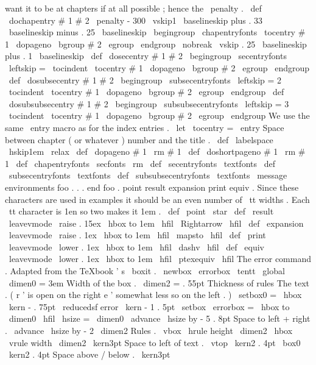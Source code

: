 {{want
it
to
be
at
chapters
%
if
at
all
possible
;
hence
the
\
penalty
.
\
def
\
dochapentry
#
1
#
2
{
%
\
penalty
-
300
\
vskip1
\
baselineskip
plus
.
33
\
baselineskip
minus
.
25
\
baselineskip
\
begingroup
\
chapentryfonts
\
tocentry
{
#
1
}
{
\
dopageno
\
bgroup
#
2
\
egroup
}
%
\
endgroup
\
nobreak
\
vskip
.
25
\
baselineskip
plus
.
1
\
baselineskip
}
\
def
\
dosecentry
#
1
#
2
{
\
begingroup
\
secentryfonts
\
leftskip
=
\
tocindent
\
tocentry
{
#
1
}
{
\
dopageno
\
bgroup
#
2
\
egroup
}
%
\
endgroup
}
\
def
\
dosubsecentry
#
1
#
2
{
\
begingroup
\
subsecentryfonts
\
leftskip
=
2
\
tocindent
\
tocentry
{
#
1
}
{
\
dopageno
\
bgroup
#
2
\
egroup
}
%
\
endgroup
}
\
def
\
dosubsubsecentry
#
1
#
2
{
\
begingroup
\
subsubsecentryfonts
\
leftskip
=
3
\
tocindent
\
tocentry
{
#
1
}
{
\
dopageno
\
bgroup
#
2
\
egroup
}
%
\
endgroup
}
%
We
use
the
same
\
entry
macro
as
for
the
index
entries
.
\
let
\
tocentry
=
\
entry
%
Space
between
chapter
(
or
whatever
)
number
and
the
title
.
\
def
\
labelspace
{
\
hskip1em
\
relax
}
\
def
\
dopageno
#
1
{
{
\
rm
#
1
}
}
\
def
\
doshortpageno
#
1
{
{
\
rm
#
1
}
}
\
def
\
chapentryfonts
{
\
secfonts
\
rm
}
\
def
\
secentryfonts
{
\
textfonts
}
\
def
\
subsecentryfonts
{
\
textfonts
}
\
def
\
subsubsecentryfonts
{
\
textfonts
}
\
message
{
environments
}
%
foo
.
.
.
end
foo
.
%
point
{
}
result
{
}
expansion
{
}
print
{
}
equiv
{
}
.
%
%
Since
these
characters
are
used
in
examples
it
should
be
an
even
number
of
%
\
tt
widths
.
Each
\
tt
character
is
1en
so
two
makes
it
1em
.
%
\
def
\
point
{
\
star
}
\
def
\
result
{
\
leavevmode
\
raise
.
15ex
\
hbox
to
1em
{
\
hfil
\
Rightarrow
\
hfil
}
}
\
def
\
expansion
{
\
leavevmode
\
raise
.
1ex
\
hbox
to
1em
{
\
hfil
\
mapsto
\
hfil
}
}
\
def
\
print
{
\
leavevmode
\
lower
.
1ex
\
hbox
to
1em
{
\
hfil
\
dashv
\
hfil
}
}
\
def
\
equiv
{
\
leavevmode
\
lower
.
1ex
\
hbox
to
1em
{
\
hfil
\
ptexequiv
\
hfil
}
}
%
The
error
{
}
command
.
%
Adapted
from
the
TeXbook
'
s
\
boxit
.
%
\
newbox
\
errorbox
%
{
\
tentt
\
global
\
dimen0
=
3em
}
%
Width
of
the
box
.
\
dimen2
=
.
55pt
%
Thickness
of
rules
%
The
text
.
(
r
'
is
open
on
the
right
e
'
somewhat
less
so
on
the
left
.
)
\
setbox0
=
\
hbox
{
\
kern
-
.
75pt
\
reducedsf
error
\
kern
-
1
.
5pt
}
%
\
setbox
\
errorbox
=
\
hbox
to
\
dimen0
{
\
hfil
\
hsize
=
\
dimen0
\
advance
\
hsize
by
-
5
.
8pt
%
Space
to
left
+
right
.
\
advance
\
hsize
by
-
2
\
dimen2
%
Rules
.
\
vbox
{
%
\
hrule
height
\
dimen2
\
hbox
{
\
vrule
width
\
dimen2
\
kern3pt
%
Space
to
left
of
text
.
\
vtop
{
\
kern2
.
4pt
\
box0
\
kern2
.
4pt
}
%
Space
above
/
below
.
\
kern3pt
}}}}}
